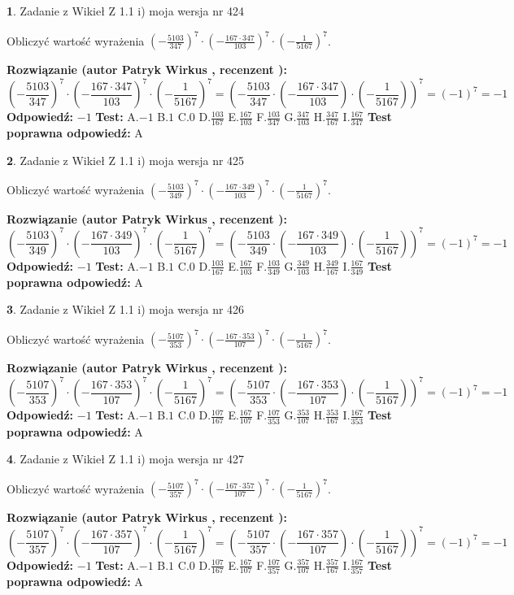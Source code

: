 \documentclass[12pt, a4paper]{article}
\theoremstyle{definition} %
\newtheorem{zad}{}
\newcommand{\zadStart}[1]{\begin{zad}#1\newline}
\newcommand{\zadStop}{\end{zad}}
\newcommand{\rozwStart}[2]{\noindent \textbf{Rozwiązanie (autor #1 , recenzent #2): }\newline}
\newcommand{\rozwStop}{\newline}
\newcommand{\odpStart}{\noindent \textbf{Odpowiedź:}\newline}
\newcommand{\odpStop}{\newline}
\newcommand{\testStart}{\noindent \textbf{Test:}\newline}
\newcommand{\testStop}{\newline}
\newcommand{\kluczStart}{\noindent \textbf{Test poprawna odpowiedź:}\newline}
\newcommand{\kluczStop}{\newline}
\begin{document}
\zadStart{Zadanie z Wikieł Z 1.1 i) moja wersja nr 424}

Obliczyć wartość wyrażenia $(-\frac{5103}{347})^{7} \cdot (-\frac{167 \cdot 347}{103})^{7} \cdot (-\frac{1}{5167})^{7}$.
\zadStop
\rozwStart{Patryk Wirkus}{}
$$(-\frac{5103}{347})^{7} \cdot (-\frac{167 \cdot 347}{103})^{7} \cdot (-\frac{1}{5167})^{7} = (-\frac{5103}{347} \cdot (-\frac{167 \cdot 347}{103}) \cdot (-\frac{1}{5167}))^{7} = (-1)^{7} = -1$$
\rozwStop
\odpStart
$-1$
\odpStop
\testStart
A.$-1$ B.$1$ C.$0$ D.$\frac{103}{167}$ E.$\frac{167}{103}$
F.$\frac{103}{347}$ G.$\frac{347}{103}$
H.$\frac{347}{167}$
I.$\frac{167}{347}$
\testStop
\kluczStart
A
\kluczStop



\zadStart{Zadanie z Wikieł Z 1.1 i) moja wersja nr 425}

Obliczyć wartość wyrażenia $(-\frac{5103}{349})^{7} \cdot (-\frac{167 \cdot 349}{103})^{7} \cdot (-\frac{1}{5167})^{7}$.
\zadStop
\rozwStart{Patryk Wirkus}{}
$$(-\frac{5103}{349})^{7} \cdot (-\frac{167 \cdot 349}{103})^{7} \cdot (-\frac{1}{5167})^{7} = (-\frac{5103}{349} \cdot (-\frac{167 \cdot 349}{103}) \cdot (-\frac{1}{5167}))^{7} = (-1)^{7} = -1$$
\rozwStop
\odpStart
$-1$
\odpStop
\testStart
A.$-1$ B.$1$ C.$0$ D.$\frac{103}{167}$ E.$\frac{167}{103}$
F.$\frac{103}{349}$ G.$\frac{349}{103}$
H.$\frac{349}{167}$
I.$\frac{167}{349}$
\testStop
\kluczStart
A
\kluczStop



\zadStart{Zadanie z Wikieł Z 1.1 i) moja wersja nr 426}

Obliczyć wartość wyrażenia $(-\frac{5107}{353})^{7} \cdot (-\frac{167 \cdot 353}{107})^{7} \cdot (-\frac{1}{5167})^{7}$.
\zadStop
\rozwStart{Patryk Wirkus}{}
$$(-\frac{5107}{353})^{7} \cdot (-\frac{167 \cdot 353}{107})^{7} \cdot (-\frac{1}{5167})^{7} = (-\frac{5107}{353} \cdot (-\frac{167 \cdot 353}{107}) \cdot (-\frac{1}{5167}))^{7} = (-1)^{7} = -1$$
\rozwStop
\odpStart
$-1$
\odpStop
\testStart
A.$-1$ B.$1$ C.$0$ D.$\frac{107}{167}$ E.$\frac{167}{107}$
F.$\frac{107}{353}$ G.$\frac{353}{107}$
H.$\frac{353}{167}$
I.$\frac{167}{353}$
\testStop
\kluczStart
A
\kluczStop



\zadStart{Zadanie z Wikieł Z 1.1 i) moja wersja nr 427}

Obliczyć wartość wyrażenia $(-\frac{5107}{357})^{7} \cdot (-\frac{167 \cdot 357}{107})^{7} \cdot (-\frac{1}{5167})^{7}$.
\zadStop
\rozwStart{Patryk Wirkus}{}
$$(-\frac{5107}{357})^{7} \cdot (-\frac{167 \cdot 357}{107})^{7} \cdot (-\frac{1}{5167})^{7} = (-\frac{5107}{357} \cdot (-\frac{167 \cdot 357}{107}) \cdot (-\frac{1}{5167}))^{7} = (-1)^{7} = -1$$
\rozwStop
\odpStart
$-1$
\odpStop
\testStart
A.$-1$ B.$1$ C.$0$ D.$\frac{107}{167}$ E.$\frac{167}{107}$
F.$\frac{107}{357}$ G.$\frac{357}{107}$
H.$\frac{357}{167}$
I.$\frac{167}{357}$
\testStop
\kluczStart
A
\kluczStop
\end{document}
